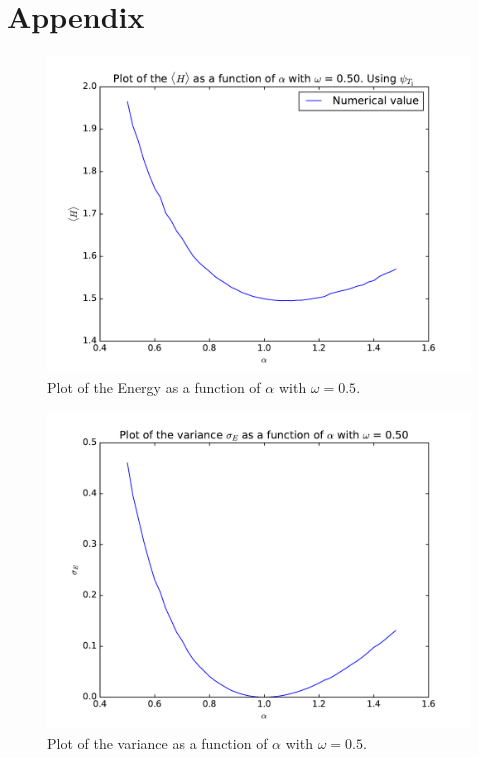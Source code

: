 \documentclass[12pt]{article}
\begin{document}
\section{Appendix}
\begin{figure}[h]
\centering
\includegraphics[width=\linewidth]{Plots/Energy_alpha_plot_omega05.pdf}
\caption{Plot of the Energy as a function of $\alpha$ with $\omega = 0.5$.}
\label{fig:Energy_alpha_omega05}

\end{figure}
\begin{figure}[h]
\centering
\includegraphics[width=\linewidth]{Plots/Variance_alpha_plot_omega05.pdf}
\caption{Plot of the variance as a function of $\alpha$ with $\omega = 0.5$.}
\label{fig:Variance_alpha_omega05}
\end{figure}
\end{document}
